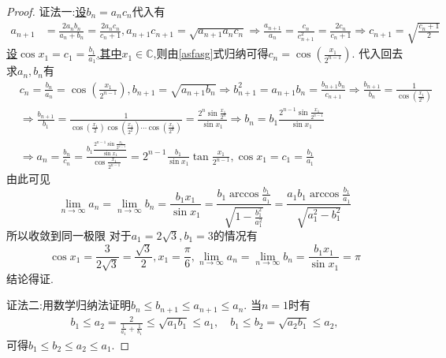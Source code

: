 \documentclass[../../main.tex]{subfiles}%
\begin{document}
\begin{proof}

{\color{blue}证法一:}\hyperlink{比值换元的问题}{设\(b_n = a_nc_n\)}代入有
\begin{align}
a_{n + 1}&=\frac{2a_nb_n}{a_n + b_n}=\frac{2a_nc_n}{c_n + 1},a_{n + 1}c_{n + 1}=\sqrt{a_{n + 1}a_nc_n}\Rightarrow\frac{a_{n + 1}}{a_n}=\frac{c_n}{c_{n + 1}^2}=\frac{2c_n}{c_n + 1}\Rightarrow c_{n + 1}=\sqrt{\frac{c_n + 1}{2}}\label{asfasg}
\end{align}
\hyperlink{三角换元的问题}{设\(\cos x_1 = c_1=\frac{b_1}{a_1}\),其中$x_1\in \mathbb{C}$},则由\eqref{asfasg}式归纳可得$c_n=\cos \left( \frac{x_1}{2^{n-1}} \right)$.
代入回去求\(a_n,b_n\)有
\begin{align*}
&c_n=\frac{b_n}{a_n}=\cos\left(\frac{x_1}{2^{n - 1}}\right),b_{n + 1}=\sqrt{a_{n + 1}b_n}\Rightarrow b_{n + 1}^2=a_{n + 1}b_n=\frac{b_{n + 1}b_n}{c_{n + 1}}\Rightarrow\frac{b_{n + 1}}{b_n}=\frac{1}{\cos\left(\frac{x_1}{2^{n}}\right)}\\
&\Rightarrow \frac{b_{n + 1}}{b_1}=\frac{1}{\cos\left(\frac{x_1}{2}\right)\cos\left(\frac{x_1}{2^2}\right)\cdots\cos\left(\frac{x_1}{2^n}\right)}=\frac{2^n\sin\frac{x_1}{2^n}}{\sin x_1}\Rightarrow b_n = b_1\frac{2^{n - 1}\sin\frac{x_1}{2^{n - 1}}}{\sin x_1}\\
&\Rightarrow a_n=\frac{b_n}{c_n}=\frac{b_1\frac{2^{n - 1}\sin\frac{x_1}{2^{n - 1}}}{\sin x_1}}{\cos\frac{x_1}{2^{n - 1}}}=2^{n - 1}\frac{b_1}{\sin x_1}\tan\frac{x_1}{2^{n - 1}},\cos x_1 = c_1=\frac{b_1}{a_1}
\end{align*}
由此可见
\[
\lim_{n\rightarrow\infty}a_n=\lim_{n\rightarrow\infty}b_n=\frac{b_1x_1}{\sin x_1}=\frac{b_1\arccos\frac{b_1}{a_1}}{\sqrt{1 - \frac{b_1^2}{a_1^2}}}=\frac{a_1b_1\arccos\frac{b_1}{a_1}}{\sqrt{a_1^2 - b_1^2}}
\]
所以收敛到同一极限
对于\(a_1 = 2\sqrt{3},b_1 = 3\)的情况有
\[
\cos x_1=\frac{3}{2\sqrt{3}}=\frac{\sqrt{3}}{2},x_1=\frac{\pi}{6},\lim_{n\rightarrow\infty}a_n=\lim_{n\rightarrow\infty}b_n=\frac{b_1x_1}{\sin x_1}=\pi
\]
结论得证.

{\color{blue}证法二:}用数学归纳法证明$b_n \leqslant b_{n+1} \leqslant a_{n+1} \leqslant a_n$.
当$n = 1$时有
\begin{align*}
b_1 \leqslant a_2 = \frac{2}{\frac{1}{a_1} + \frac{1}{b_1}} \leqslant \sqrt{a_1 b_1} \leqslant a_1, \quad
b_1 \leqslant b_2 = \sqrt{a_2 b_1} \leqslant a_2,
\end{align*}
可得$b_1 \leqslant b_2 \leqslant a_2 \leqslant a_1$.


\end{proof}
\end{document}
